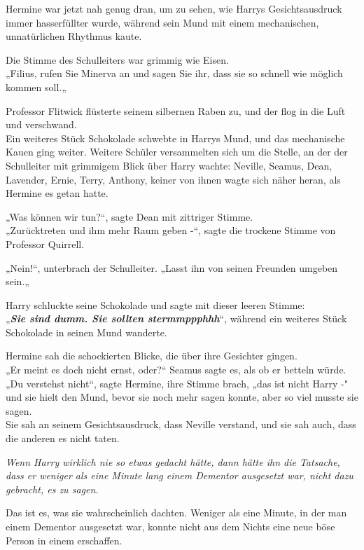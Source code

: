 {Hermine war jetzt nah genug dran, um zu sehen, wie Harrys Gesichtsausdruck immer hasserfüllter wurde, während sein Mund mit einem mechanischen, unnatürlichen Rhythmus kaute.

Die Stimme des Schulleiters war grimmig wie Eisen.\\ „Filius, rufen Sie Minerva an und sagen Sie ihr, dass sie so schnell wie möglich kommen soll.„

Professor Flitwick flüsterte seinem silbernen Raben zu, und der flog in die Luft und verschwand.\\ Ein weiteres Stück Schokolade schwebte in Harrys Mund, und das mechanische Kauen ging weiter. Weitere Schüler versammelten sich um die Stelle, an der der Schulleiter mit grimmigem Blick über Harry wachte: Neville, Seamus, Dean, Lavender, Ernie, Terry, Anthony, keiner von ihnen wagte sich näher heran, als Hermine es getan hatte.

„Was können wir tun?“, sagte Dean mit zittriger Stimme.\\ „Zurücktreten und ihm mehr Raum geben -“, sagte die trockene Stimme von Professor Quirrell.

„Nein!“, unterbrach der Schulleiter. „Lasst ihn von seinen Freunden umgeben sein.„

Harry schluckte seine Schokolade und sagte mit dieser leeren Stimme:\\ „\textbf{\emph{Sie sind dumm. Sie sollten stermmppphhh}}“, während ein weiteres Stück Schokolade in seinen Mund wanderte.

Hermine sah die schockierten Blicke, die über ihre Gesichter gingen.\\ „Er meint es doch nicht ernst, oder?“ Seamus sagte es, als ob er betteln würde.\\ „Du verstehst nicht“, sagte Hermine, ihre Stimme brach, „das ist nicht Harry -"\\ und sie hielt den Mund, bevor sie noch mehr sagen konnte, aber so viel musste sie sagen.\\ Sie sah an seinem Gesichtsausdruck, dass Neville verstand, und sie sah auch, dass die anderen es nicht taten.

\emph{Wenn Harry wirklich nie so etwas gedacht hätte, dann hätte ihn die Tatsache, dass er weniger als eine Minute lang einem Dementor ausgesetzt war, nicht dazu gebracht, es zu sagen.}

Das ist es, was sie wahrscheinlich dachten. Weniger als eine Minute, in der man einem Dementor ausgesetzt war, konnte nicht aus dem Nichts eine neue böse Person in einem erschaffen.

}
